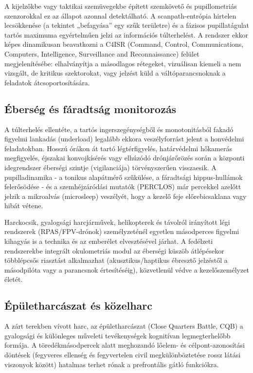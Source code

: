 \documentclass[12pt,a4paper,oneside]{book}
\begin{document}
A kijelzőkbe vagy taktikai szemüvegekbe épített szemkövető és pupillometriás szenzorokkal ez az állapot azonnal detektálható. A scanpath-entrópia hirtelen lecsökkenése (a tekintet „befagyása” egy szűk területre) és a fázisos pupillatágulat tartós maximuma egyértelműen jelzi az információs túlterhelést. A rendszer ekkor képes dinamikusan beavatkozni a C4ISR (Command, Control, Communications, Computers, Intelligence, Surveillance and Reconnaissance) felület megjelenítésébe: elhalványítja a másodlagos rétegeket, vizuálisan kiemeli a nem vizsgált, de kritikus szektorokat, vagy jelzést küld a váltóparancsnoknak a feladatok átcsoportosítására.

\subsection{Éberség és fáradtság monitorozás}

A túlterhelés ellentéte, a tartós ingerszegénységből és monotonitásból fakadó figyelmi lankadás (underload) legalább ekkora veszélyforrást jelent a honvédelmi feladatokban. Hosszú órákon át tartó légtérfigyelés, határvédelmi hőkamerás megfigyelés, éjszakai konvojkísérés vagy elhúzódó drónjárőrözés során a központi idegrendszer éberségi szintje (vigilanciája) törvényszerűen visszaesik. A pupilladinamika - a tonikus alapátmérő szűkülése, a fáradtsági hippus-hullámok felerősödése - és a szemhéjzáródási mutatók (PERCLOS) már percekkel azelőtt jelzik a mikroalvás (microsleep) veszélyét, hogy a kezelő feje előrebicsaklana vagy hibát vétene.

Harckocsik, gyalogsági harcjárművek, helikopterek és távolról irányított légi rendszerek (RPAS/FPV-drónok) személyzeténél egyetlen másodperces figyelmi kihagyás is a technika és az emberélet elvesztésével járhat. A fedélzeti rendszerekbe integrált okulometriás modul az éberségi küszöb átlépésekor többlépcsős riasztást alkalmazhat (akusztikus/haptikus ébresztő jelzéstől a másodpilóta vagy a parancsnok értesítéséig), közvetlenül védve a kezelőszemélyzet életét.

\subsection{Épületharcászat és közelharc}

A zárt terekben vívott harc, az épületharcászat (Close Quarters Battle, CQB) a gyalogsági és különleges műveleti tevékenységek kognitívan legmegterhelőbb formája. A töredékmásodpercek alatt meghozandó lőelem- és célpont-azonosítási döntések (fegyveres ellenség és fegyvertelen civil megkülönböztetése rossz látási viszonyok között) hatalmas terhet rónak a prefrontális gátló funkciókra.
\end{document}
